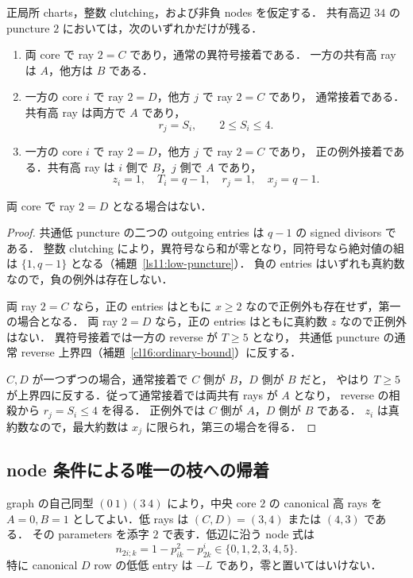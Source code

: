 \begin{lemma}
\label{hs18:shared-types}
正局所 charts，整数 clutching，および非負 nodes を仮定する．
共有高辺 $34$ の puncture $2$ においては，次のいずれかだけが残る．
\begin{enumerate}
\item 両 core で ray $2=C$ であり，通常の異符号接着である．
一方の共有高 ray は $A$，他方は $B$ である．
\item 一方の core $i$ で ray $2=D$，他方 $j$ で ray $2=C$ であり，
通常接着である．共有高 ray は両方で $A$ であり，
\[
 r_j=S_i,\qquad 2\le S_i\le4.
\]
\item 一方の core $i$ で ray $2=D$，他方 $j$ で ray $2=C$ であり，
正の例外接着である．共有高 ray は $i$ 側で $B$，$j$ 側で $A$ であり，
\[
 z_i=1,\quad T_i=q-1,\quad r_j=1,\quad x_j=q-1.
\]
\end{enumerate}
両 core で ray $2=D$ となる場合はない．
\end{lemma}

\begin{proof}
共通低 puncture の二つの outgoing entries は $q-1$ の signed divisors である．
整数 clutching により，異符号なら和が零となり，同符号なら絶対値の組は
$\{1,q-1\}$ となる（補題~\ref{ls11:low-puncture}）．
負の entries はいずれも真約数なので，負の例外は存在しない．

両 ray $2=C$ なら，正の entries はともに $x\ge2$ なので正例外も存在せず，第一の場合となる．
両 ray $2=D$ なら，正の entries はともに真約数 $z$ なので正例外はない．
異符号接着では一方の reverse が $T\ge5$ となり，
共通低 puncture の通常 reverse 上界四（補題~\ref{cl16:ordinary-bound}）に反する．

$C,D$ が一つずつの場合，通常接着で $C$ 側が $B$，$D$ 側が $B$ だと，
やはり $T\ge5$ が上界四に反する．従って通常接着では両共有 rays が $A$ となり，
reverse の相殺から $r_j=S_i\le4$ を得る．
正例外では $C$ 側が $A$，$D$ 側が $B$ である．
$z_i$ は真約数なので，最大約数は $x_j$ に限られ，第三の場合を得る．
\end{proof}

\subsection{node 条件による唯一の枝への帰着}

graph の自己同型 $(0\ 1)(3\ 4)$ により，中央 core $2$ の canonical 高 rays を
$A=0,B=1$ としてよい．低 rays は $(C,D)=(3,4)$ または $(4,3)$ である．
その parameters を添字 $2$ で表す．低辺に沿う node 式は
\begin{equation}\label{hs18:low-node}
 n_{2i;k}=1-p^2_{ik}-p^i_{2k}\in\{0,1,2,3,4,5\}.
\end{equation}
特に canonical $D$ row の低低 entry は $-L$ であり，零と置いてはいけない．

